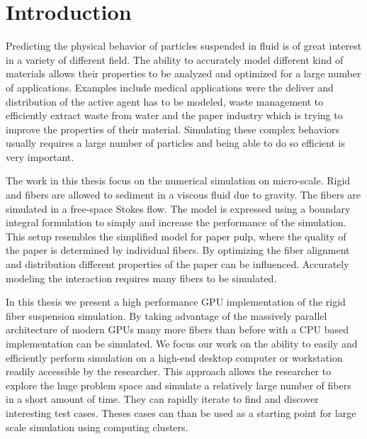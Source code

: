 \documentclass[a4paper,11pt]{kth-mag}
\begin{document}
\tableofcontents*

\clearpage

\listoffigures
\clearpage

\listoftables
\clearpage

\listoflistings
\clearpage

\mainmatter
\pagestyle{newchap}

\chapter{Introduction}

Predicting the physical behavior of particles suspended in fluid is of great interest in a variety of different field. The ability to accurately model different kind of materials allows their properties to be analyzed and optimized for a large number of applications. Examples include medical applications were the deliver and distribution of the active agent has to be modeled, waste management to efficiently extract waste from water and the paper industry which is trying to improve the properties of their material. Simulating these complex behaviors usually requires a large number of particles and being able to do so efficient is very important.

The work in this thesis focus on the numerical simulation on micro-scale. Rigid and fibers are allowed to sediment in a viscous fluid due to gravity. The fibers are simulated in a free-space Stokes flow. The model is expressed using a boundary integral formulation to simply and increase the performance of the simulation. This setup resembles the simplified model for paper pulp, where the quality of the paper is determined by individual fibers. By optimizing the fiber alignment and distribution different properties of the paper can be influenced. Accurately modeling the interaction requires many fibers to be simulated.

In this thesis we present a high performance GPU implementation of the rigid fiber suspension simulation. By taking advantage of the massively parallel architecture of modern GPUs many more fibers than before with a CPU based implementation can be simulated. We focus our work on the ability to easily and efficiently perform simulation on a high-end desktop computer or workstation readily accessible by the researcher. This approach allows the researcher to explore the huge problem space and simulate a relatively large number of fibers in a short amount of time. They can rapidly iterate to find and discover interesting test cases. Theses cases can than be used as a starting point for large scale simulation using computing clusters.
\end{document}
